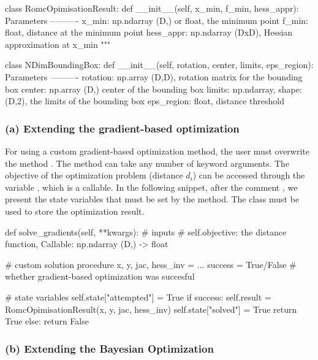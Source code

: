\documentclass[article]{jss}
\begin{document}
\begin{Code}
class RomcOpimisationResult:
    def __init__(self, x_min, f_min, hess_appr):
        Parameters
        ----------
        x_min: np.ndarray (D,) or float, the minimum point
        f_min: float, distance at the minimum point
        hess_appr: np.ndarray (DxD), Hessian approximation at x_min
        """

class NDimBoundingBox:
    def __init__(self, rotation, center, limits, eps_region):
        Parameters
        ----------
        rotation: np.array (D,D),  rotation matrix for the bounding box
        center: np.array (D,) center of the bounding box
        limits: np.ndarray, shape: (D,2), the limits of the bounding box
        eps_region: float, distance threshold
\end{Code}

\subsubsection*{(a) Extending the gradient-based optimization}

For using a custom gradient-based optimization method, the user must
overwrite the method . The method can take any
number of keyword arguments. The objective of the optimization problem
(distance \(d_i\)) can be accessed through the variable
, which is a callable. In the following snippet,
after the comment , we present the state
variables that must be set by the method. The class
 must be used to
store the optimization result.

\begin{Code}
def solve_gradients(self, **kwargs):
    # inputs
    # self.objective: the distance function, Callable: np.ndarray (D,) -> float

    # custom solution procedure
    x, y, jac, hess_inv = ...
    success = True/False # whether gradient-based optimization was succesful

    # state variables
    self.state["attempted"] = True
    if success:
        self.result = RomcOpimisationResult(x, y, jac, hess_inv)
        self.state["solved"] = True
        return True
    else:
        return False
\end{Code}

\subsubsection*{(b) Extending the Bayesian Optimization}
\end{document}
